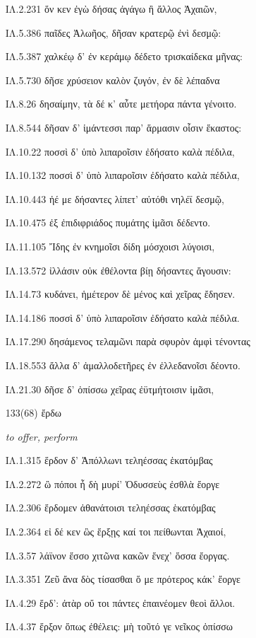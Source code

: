 \begin{enumerate}
{ΙΛ.2.231 ὅν κεν ἐγὼ δήσας ἀγάγω ἢ ἄλλος Ἀχαιῶν,

ΙΛ.5.386 παῖδες Ἀλωῆος, δῆσαν κρατερῷ ἐνὶ δεσμῷ:

ΙΛ.5.387 χαλκέῳ δ' ἐν κεράμῳ δέδετο τρισκαίδεκα μῆνας:

ΙΛ.5.730 δῆσε χρύσειον καλὸν ζυγόν, ἐν δὲ λέπαδνα

ΙΛ.8.26 δησαίμην, τὰ δέ κ' αὖτε μετήορα πάντα γένοιτο.

ΙΛ.8.544 δῆσαν δ' ἱμάντεσσι παρ' ἅρμασιν οἷσιν ἕκαστος:

ΙΛ.10.22 ποσσὶ δ' ὑπὸ λιπαροῖσιν ἐδήσατο καλὰ πέδιλα,

ΙΛ.10.132 ποσσὶ δ' ὑπὸ λιπαροῖσιν ἐδήσατο καλὰ πέδιλα,

ΙΛ.10.443 ἠέ με δήσαντες λίπετ' αὐτόθι νηλέϊ δεσμῷ,

ΙΛ.10.475 ἐξ ἐπιδιφριάδος πυμάτης ἱμᾶσι δέδεντο.

ΙΛ.11.105 Ἴδης ἐν κνημοῖσι δίδη μόσχοισι λύγοισι,

ΙΛ.13.572 ἰλλάσιν οὐκ ἐθέλοντα βίῃ δήσαντες ἄγουσιν:

ΙΛ.14.73 κυδάνει, ἡμέτερον δὲ μένος καὶ χεῖρας ἔδησεν.

ΙΛ.14.186 ποσσὶ δ' ὑπὸ λιπαροῖσιν ἐδήσατο καλὰ πέδιλα.

ΙΛ.17.290 δησάμενος τελαμῶνι παρὰ σφυρὸν ἀμφὶ τένοντας

ΙΛ.18.553 ἄλλα δ' ἀμαλλοδετῆρες ἐν ἐλλεδανοῖσι δέοντο.

ΙΛ.21.30 δῆσε δ' ὀπίσσω χεῖρας ἐϋτμήτοισιν ἱμᾶσι,

}

\clearpage
\item[\large 133(68)]{\large \g ἔρδω	}

\hspace{0.2cm} \textit{ to offer, perform  }

{\g
ΙΛ.1.315 ἕρδον δ' Ἀπόλλωνι τεληέσσας ἑκατόμβας

ΙΛ.2.272 ὢ πόποι ἦ δὴ μυρί' Ὀδυσσεὺς ἐσθλὰ ἔοργε

ΙΛ.2.306 ἕρδομεν ἀθανάτοισι τεληέσσας ἑκατόμβας

ΙΛ.2.364 εἰ δέ κεν ὣς ἕρξῃς καί τοι πείθωνται Ἀχαιοί,

ΙΛ.3.57 λάϊνον ἕσσο χιτῶνα κακῶν ἕνεχ' ὅσσα ἔοργας.

ΙΛ.3.351 Ζεῦ ἄνα δὸς τίσασθαι ὅ με πρότερος κάκ' ἔοργε

ΙΛ.4.29 ἕρδ': ἀτὰρ οὔ τοι πάντες ἐπαινέομεν θεοὶ ἄλλοι.

ΙΛ.4.37 ἕρξον ὅπως ἐθέλεις: μὴ τοῦτό γε νεῖκος ὀπίσσω

}
\end{enumerate}
